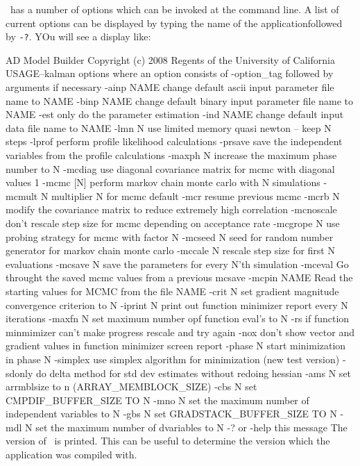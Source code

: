 
\ADM\ has a number of options which can be invoked at the command line.
A list of current options can be displayed by typing the name of the applicationfollowed by {\tt -?}. YOu will see a display like:

\beginexample
 AD Model Builder Copyright (c) 2008 Regents of the University of California
 USAGE--kalman options
 where an option consists of -option_tag followed by arguments if necessary
 -ainp NAME      change default ascii input parameter file name to NAME
 -binp NAME      change default binary input parameter file name to NAME
 -est            only do the parameter estimation
 -ind NAME       change default input data file name to NAME
 -lmn N          use limited memory quasi newton -- keep N steps
 -lprof          perform profile likelihood calculations
 -prsave         save the independent variables from the profile calculations
 -maxph N        increase the maximum phase number to N
 -mcdiag         use diagonal covariance matrix for mcmc with diagonal values 1
 -mcmc [N]       perform markov chain monte carlo with N simulations
 -mcmult N       multiplier N for mcmc default
 -mcr            resume previous mcmc
 -mcrb N         modify the covariance matrix to reduce extremely high correlation      
 -mcnoscale      don't rescale step size for mcmc depending on acceptance rate
 -mcgrope N      use probing strategy for mcmc with factor N
 -mcseed N       seed for random number generator for markov chain monte carlo
 -mccale N       rescale step size for first N evaluations
 -mcsave N       save the parameters for every N'th simulation
 -mceval         Go throught the saved mcmc values from a previous mcsave
 -mcpin NAME      Read the starting values for MCMC from the file NAME
 -crit N         set gradient magnitude convergence criterion to N
 -iprint N       print out function minimizer report every N iterations
 -maxfn N        set maximum number opf function eval's to N
 -rs             if function minmimizer can't make progress rescale and try again
 -nox            don't show vector and gradient values in function minimizer screen report
 -phase N        start minimization in phase N
 -simplex        use simplex algorithm for minimization (new test version)
 -sdonly         do delta method for std dev estimates without redoing hessian
 -ams N          set arrmblsize to n (ARRAY_MEMBLOCK_SIZE) 
 -cbs N          set CMPDIF_BUFFER_SIZE TO N 
 -mno N          set the maximum number of independent variables to N
 -gbs N          set GRADSTACK_BUFFER_SIZE TO N 
 -mdl N          set the maximum number of dvariables to N
 -? or -help     this message
\endexample
The version of \ADM\ is printed. This can be useful to determine
the version which the application was compiled with.

